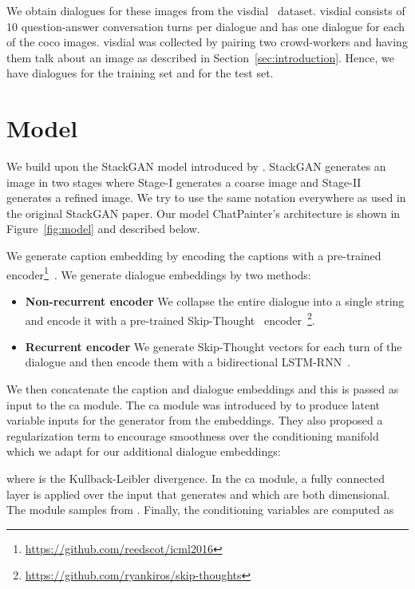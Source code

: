 \documentclass{article}
\begin{document}
We obtain dialogues for these images from  the \gls{visdial}~\cite{das2016visual} dataset. \gls{visdial} consists of 10 question-answer conversation turns per dialogue and has one dialogue for each of the \gls{coco} images. \gls{visdial} was collected by pairing two crowd-workers and having them talk about an image as described in Section~\ref{sec:introduction}. Hence, we have  dialogues for the training set and  for the test set.


\section{Model}
\label{sec:model}
We build upon the StackGAN model introduced by \citet{Zhang_2017_ICCV}. StackGAN generates an image in two stages where Stage-I generates a coarse  image and Stage-II generates a refined  image. We try to use the same notation everywhere as used in the original StackGAN paper. Our model ChatPainter's architecture is shown in Figure~\ref{fig:model} and described below.

We generate caption embedding  by encoding the captions with a pre-trained encoder\footnote{\scriptsize \url{https://github.com/reedscot/icml2016}}~\cite{ICML2016_reed}. We generate dialogue embeddings  by two methods:
\begin{itemize}[noitemsep,topsep=0pt]
    \item \textbf{Non-recurrent encoder} We collapse the entire dialogue into a single string and encode it with a pre-trained Skip-Thought~\cite{NIPS2015_skipthought} encoder~\footnote{\scriptsize \url{https://github.com/ryankiros/skip-thoughts}}.
    \item \textbf{Recurrent encoder} We generate Skip-Thought vectors for each turn of the dialogue and then encode them with a bidirectional LSTM-RNN~\cite{graves2005framewise,hochreiter1997long}.
\end{itemize}

We then concatenate the caption and dialogue embeddings and this is passed as input to the \gls{ca} module. The \gls{ca} module was introduced by \citet{Zhang_2017_ICCV} to produce latent variable inputs for the generator from the embeddings. They also proposed a regularization term to encourage smoothness over the conditioning manifold which we adapt for our additional dialogue embeddings:

where  is the Kullback-Leibler divergence. In the \gls{ca} module, a fully connected layer is applied over the input that generates  and  which are both  dimensional. The module samples  from . Finally, the conditioning variables  are computed as
\end{document}
